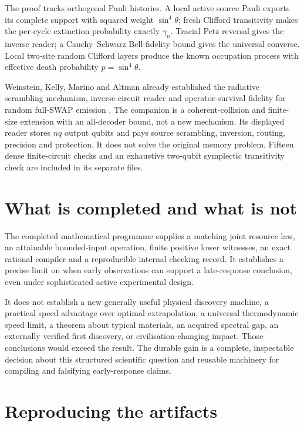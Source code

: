 \documentclass[11pt,a4paper]{article}
\begin{document}
The proof tracks orthogonal Pauli histories. A local active source Pauli exports its complete support with squared weight $\sin^4\theta$; fresh Clifford transitivity makes the per-cycle extinction probability exactly $\gamma_n$. Tracial Petz reversal gives the inverse reader; a Cauchy--Schwarz Bell-fidelity bound gives the universal converse. Local two-site random Clifford layers produce the known occupation process with effective death probability $p=\sin^4\theta$.

Weinstein, Kelly, Marino and Altman already established the radiative scrambling mechanism, inverse-circuit reader and operator-survival fidelity for random full-SWAP emission \cite{weinstein}. The companion is a coherent-collision and finite-size extension with an all-decoder bound, not a new mechanism. Its displayed reader stores $nq$ output qubits and pays source scrambling, inversion, routing, precision and protection. It does not solve the original memory problem. Fifteen dense finite-circuit checks and an exhaustive two-qubit symplectic transitivity check are included in its separate files.

\section{What is completed and what is not}

The completed mathematical programme supplies a matching joint resource law, an attainable bounded-input operation, finite positive lower witnesses, an exact rational compiler and a reproducible internal checking record. It establishes a precise limit on when early observations can support a late-response conclusion, even under sophisticated active experimental design.

It does not establish a new generally useful physical discovery machine, a practical speed advantage over optimal extrapolation, a universal thermodynamic speed limit, a theorem about typical materials, an acquired spectral gap, an externally verified first discovery, or civilisation-changing impact. Those conclusions would exceed the result. The durable gain is a complete, inspectable decision about this structured scientific question and reusable machinery for compiling and falsifying early-response claims.

\appendix
\section{Reproducing the artifacts}
\end{document}
